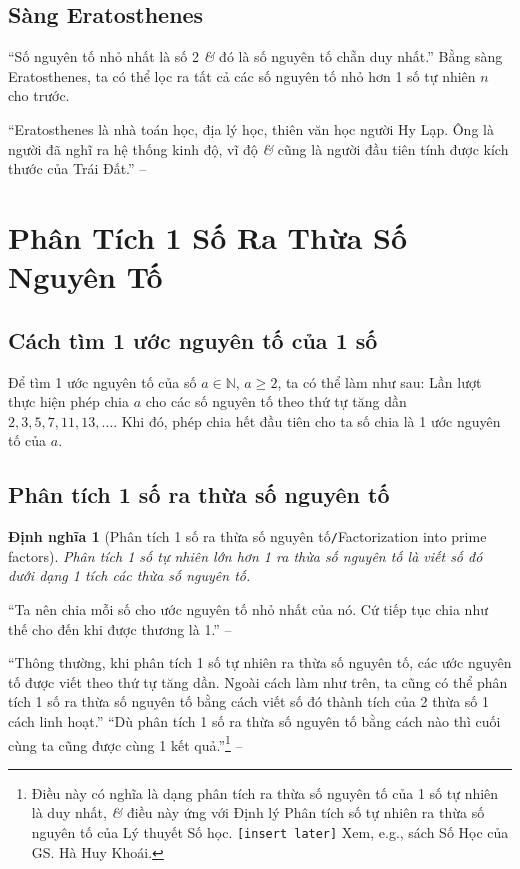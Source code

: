 \documentclass[oneside]{book}
\numberwithin{equation}{section}
\newtheorem{dinhnghia}{Định nghĩa}[section]
\begin{document}
\subsection{Sàng Eratosthenes}
``Số nguyên tố nhỏ nhất là số 2 \textit{\&} đó là số nguyên tố chẵn duy nhất.'' Bằng sàng Eratosthenes, ta có thể lọc ra tất cả các số nguyên tố nhỏ hơn 1 số tự nhiên $n$ cho trước.

``Eratosthenes là nhà toán học, địa lý học, thiên văn học người Hy Lạp. Ông là người đã nghĩ ra hệ thống kinh độ, vĩ độ \textit{\&} cũng là người đầu tiên tính được kích thước của Trái Đất.'' -- \cite[p. 43]{Thai_Anh_Dat_Ha_Loan_Nam_Quang_Toan_6_tap_1}


\section{Phân Tích 1 Số Ra Thừa Số Nguyên Tố}

\subsection{Cách tìm 1 ước nguyên tố của 1 số}
\begin{tcolorbox}
	Để tìm 1 ước nguyên tố của số $a\in\mathbb{N}$, $a\ge 2$, ta có thể làm như sau: Lần lượt thực hiện phép chia $a$ cho các số nguyên tố theo thứ tự tăng dần $2,3,5,7,11,13,\ldots$. Khi đó, phép chia hết đầu tiên cho ta số chia là 1 ước nguyên tố của $a$.
\end{tcolorbox}

\subsection{Phân tích 1 số ra thừa số nguyên tố}

\begin{dinhnghia}[Phân tích 1 số ra thừa số nguyên tố\texttt{/}Factorization into prime factors]
	\emph{Phân tích 1 số tự nhiên lớn hơn 1 ra thừa số nguyên tố} là viết số đó dưới dạng 1 tích các thừa số nguyên tố.
\end{dinhnghia}
``Ta nên chia mỗi số cho ước nguyên tố nhỏ nhất của nó. Cứ tiếp tục chia như thế cho đến khi được thương là 1.'' -- \cite[p. 45]{Thai_Anh_Dat_Ha_Loan_Nam_Quang_Toan_6_tap_1}

``Thông thường, khi phân tích 1 số tự nhiên ra thừa số nguyên tố, các ước nguyên tố được viết theo thứ tự tăng dần. Ngoài cách làm như trên, ta cũng có thể phân tích 1 số ra thừa số nguyên tố bằng cách viết số đó thành tích của 2 thừa số 1 cách linh hoạt.'' ``Dù phân tích 1 số ra thừa số nguyên tố bằng cách nào thì cuối cùng ta cũng được cùng 1 kết quả.''\footnote{Điều này có nghĩa là dạng phân tích ra thừa số nguyên tố của 1 số tự nhiên là duy nhất, \textit{\&} điều này ứng với Định lý Phân tích số tự nhiên ra thừa số nguyên tố của Lý thuyết Số học. \texttt{[insert later]} Xem, e.g., sách Số Học của GS. Hà Huy Khoái.} -- \cite[p. 46]{Thai_Anh_Dat_Ha_Loan_Nam_Quang_Toan_6_tap_1}
\end{document}
